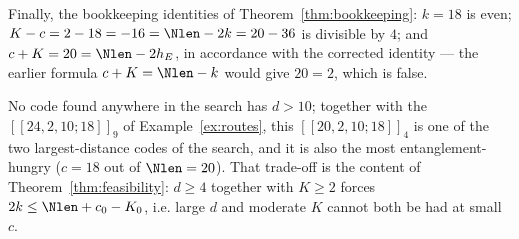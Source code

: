 \begin{example}
Finally, the bookkeeping identities of Theorem~\ref{thm:bookkeeping}:
$k=18$ is even; $K-c=2-18=-16=\Nlen-2k=20-36$ is divisible by $4$; and
$c+K=20=\Nlen-2h_E$, in accordance with the corrected identity --- the
earlier formula $c+K=\Nlen-k$ would give $20=2$, which is false.

No code found anywhere in the search has $d>10$; together with the
$[[24,2,10;18]]_9$ of Example~\ref{ex:routes}, this $[[20,2,10;18]]_4$ is
one of the two largest-distance codes of the search, and it is also the
most entanglement-hungry ($c=18$ out of $\Nlen=20$). That trade-off is
the content of Theorem~\ref{thm:feasibility}: $d\ge4$ together with
$K\ge2$ forces $2k\le\Nlen+c_0-K_0$, i.e. large $d$ and moderate $K$ cannot
both be had at small $c$.
\end{example}
